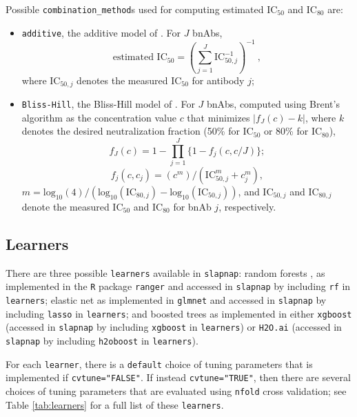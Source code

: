 \documentclass[
]{article}
\providecommand{\tightlist}{%
  \setlength{\itemsep}{0pt}\setlength{\parskip}{0pt}}
\begin{document}
Possible \texttt{combination\_method}s used for computing estimated IC\(_{50}\) and IC\(_{80}\) are:

\begin{itemize}
\tightlist
\item
  \texttt{additive}, the additive model of \citet{wagh2016optimal}. For \(J\) bnAbs, \[ \mbox{estimated IC}_{50} = \left( \sum_{j=1}^J \mbox{IC}_{50,j}^{-1} \right)^{-1} \ , \] where IC\(_{50,j}\) denotes the measured IC\(_{50}\) for antibody \(j\);
\item
  \texttt{Bliss-Hill}, the Bliss-Hill model of \citet{wagh2016optimal}. For \(J\) bnAbs, computed using Brent's algorithm \citep{brent1971} as the concentration value \(c\) that minimizes \(\lvert f_J(c) - k \rvert\), where \(k\) denotes the desired neutralization fraction (50\% for IC\(_{50}\) or 80\% for IC\(_{80}\)), \[ f_J(c) = 1 - \prod_{j = 1}^J \{1 - f_j(c, c / J)\}; \] \[ f_j(c, c_j) = (c^m) / (\mbox{IC}_{50,j}^m + c_j^m), \] \(m = \mbox{log}_{10}(4) / (\mbox{log}_{10}(\mbox{IC}_{80,j}) - \mbox{log}_{10}(\mbox{IC}_{50,j}))\), and IC\(_{50,j}\) and IC\(_{80,j}\) denote the measured IC\(_{50}\) and IC\(_{80}\) for bnAb \(j\), respectively.
\end{itemize}

\hypertarget{sec:learnerdetails}{%
\subsection{Learners}\label{sec:learnerdetails}}

There are three possible \texttt{learners} available in \texttt{slapnap}: random forests \citep{breiman2001}, as implemented in the \texttt{R} package \texttt{ranger} \citep{rangerpkg} and accessed in \texttt{slapnap} by including \texttt{\textquotesingle{}rf\textquotesingle{}} in \texttt{learners}; elastic net \citep{zou2005} as implemented in \texttt{glmnet} \citep{glmnetpkg} and accessed in \texttt{slapnap} by including \texttt{\textquotesingle{}lasso\textquotesingle{}} in \texttt{learners}; and boosted trees \citep{friedman2001, chen2016} as implemented in either \texttt{xgboost} \citep{xgboostpkg} (accessed in \texttt{slapnap} by including \texttt{\textquotesingle{}xgboost\textquotesingle{}} in \texttt{learners}) or \texttt{H2O.ai} \citep{h2opkg} (accessed in \texttt{slapnap} by including \texttt{\textquotesingle{}h2oboost\textquotesingle{}} in \texttt{learners}).

For each \texttt{learner}, there is a \texttt{default} choice of tuning parameters that is implemented if \texttt{cvtune="FALSE"}. If instead \texttt{cvtune="TRUE"}, then there are several choices of tuning parameters that are evaluated using \texttt{nfold} cross validation; see Table \ref{tab:learners} for a full list of these \texttt{learners}.
\end{document}
